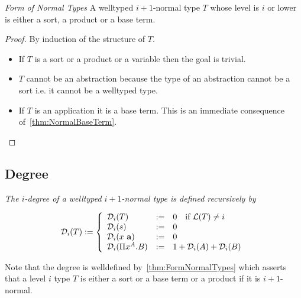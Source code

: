 \begin{theorem}
    \label{thm:FormNormalTypes}
    \emph{Form of Normal Types} A welltyped $i+1$-normal type $T$ whose level is
    $i$ or lower is either a sort, a product or a base term.


    \begin{proof}
        By induction of the structure of $T$.
        \begin{itemize}

            \item If $T$ is a sort or a product or a variable then the goal is
                trivial.

            \item $T$ cannot be an abstraction because the type of an
                abstraction cannot be a sort i.e. it cannot be a welltyped type.

            \item If $T$ is an application it is a base term. This is an
                immediate consequence of~\ref{thm:NormalBaseTerm}.
        \end{itemize}
    \end{proof}
\end{theorem}








\subsection{Degree}

\begin{definition}
    \label{def:TypeDegree}
    \emph{The $i$-degree of a welltyped $i+1$-normal type is defined recursively
    by}

    $$
    \Degree_i(T) :=
    \dcases{
        \Degree_i(T) &:=& 0 \quad\text{if } \Level(T) \ne i
        \\
        \Degree_i(s) &:=& 0
        \\
        \Degree_i(x \vec a) &:=& 0
        \\
        \Degree_i(\Pi x^A.B) &:=&
        1 + \Degree_i(A) +  \Degree_i(B)
    }
    $$

    Note that the degree is welldefined by~\ref{thm:FormNormalTypes} which
    asserts that a level $i$ type $T$ is either a sort or a base term or a
    product if it is $i+1$-normal.
\end{definition}



